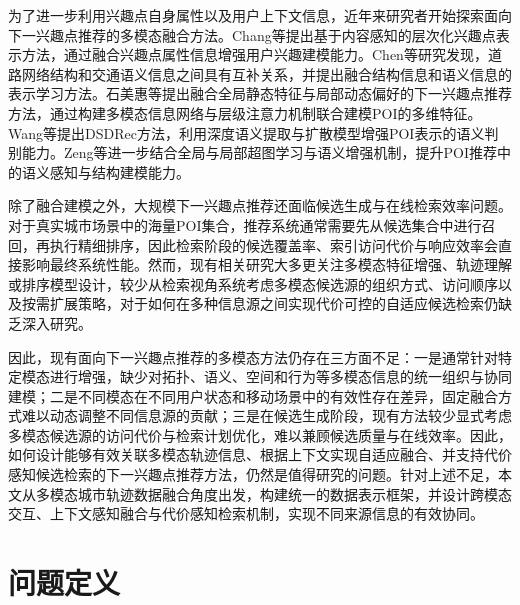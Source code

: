 \documentclass{rjthesis}
\begin{document}
为了进一步利用兴趣点自身属性以及用户上下文信息，近年来研究者开始探索面向下一兴趣点推荐的多模态融合方法。Chang等提出基于内容感知的层次化兴趣点表示方法，通过融合兴趣点属性信息增强用户兴趣建模能力\cite{chang2018cape}。Chen等研究发现，道路网络结构和交通语义信息之间具有互补关系，并提出融合结构信息和语义信息的表示学习方法\cite{chen2021toast}。石美惠等提出融合全局静态特征与局部动态偏好的下一兴趣点推荐方法，通过构建多模态信息网络与层级注意力机制联合建模POI的多维特征\cite{shi2023glnr}。Wang等提出DSDRec方法，利用深度语义提取与扩散模型增强POI表示的语义判别能力\cite{wang2024dsdrec}。Zeng等进一步结合全局与局部超图学习与语义增强机制，提升POI推荐中的语义感知与结构建模能力\cite{zeng2025glhg}。


除了融合建模之外，大规模下一兴趣点推荐还面临候选生成与在线检索效率问题。对于真实城市场景中的海量POI集合，推荐系统通常需要先从候选集合中进行召回，再执行精细排序，因此检索阶段的候选覆盖率、索引访问代价与响应效率会直接影响最终系统性能。然而，现有相关研究大多更关注多模态特征增强、轨迹理解或排序模型设计，较少从检索视角系统考虑多模态候选源的组织方式、访问顺序以及按需扩展策略，对于如何在多种信息源之间实现代价可控的自适应候选检索仍缺乏深入研究。

因此，现有面向下一兴趣点推荐的多模态方法仍存在三方面不足：一是通常针对特定模态进行增强，缺少对拓扑、语义、空间和行为等多模态信息的统一组织与协同建模；二是不同模态在不同用户状态和移动场景中的有效性存在差异，固定融合方式难以动态调整不同信息源的贡献；三是在候选生成阶段，现有方法较少显式考虑多模态候选源的访问代价与检索计划优化，难以兼顾候选质量与在线效率。因此，如何设计能够有效关联多模态轨迹信息、根据上下文实现自适应融合、并支持代价感知候选检索的下一兴趣点推荐方法，仍然是值得研究的问题。针对上述不足，本文从多模态城市轨迹数据融合角度出发，构建统一的数据表示框架，并设计跨模态交互、上下文感知融合与代价感知检索机制，实现不同来源信息的有效协同。

\section{问题定义}
\end{document}
